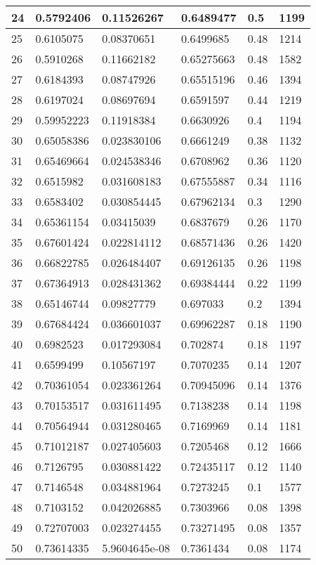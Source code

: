 \begin{longtable}{|l|l|l|l|l|l|}
24 & 0.5792406 & 0.11526267 & 0.6489477 & 0.5 & 1199 \\ \hline 
25 & 0.6105075 & 0.08370651 & 0.6499685 & 0.48 & 1214 \\ \hline 
26 & 0.5910268 & 0.11662182 & 0.65275663 & 0.48 & 1582 \\ \hline 
27 & 0.6184393 & 0.08747926 & 0.65515196 & 0.46 & 1394 \\ \hline 
28 & 0.6197024 & 0.08697694 & 0.6591597 & 0.44 & 1219 \\ \hline 
29 & 0.59952223 & 0.11918384 & 0.6630926 & 0.4 & 1194 \\ \hline 
30 & 0.65058386 & 0.023830106 & 0.6661249 & 0.38 & 1132 \\ \hline 
31 & 0.65469664 & 0.024538346 & 0.6708962 & 0.36 & 1120 \\ \hline 
32 & 0.6515982 & 0.031608183 & 0.67555887 & 0.34 & 1116 \\ \hline 
33 & 0.6583402 & 0.030854445 & 0.67962134 & 0.3 & 1290 \\ \hline 
34 & 0.65361154 & 0.03415039 & 0.6837679 & 0.26 & 1170 \\ \hline 
35 & 0.67601424 & 0.022814112 & 0.68571436 & 0.26 & 1420 \\ \hline 
36 & 0.66822785 & 0.026484407 & 0.69126135 & 0.26 & 1198 \\ \hline 
37 & 0.67364913 & 0.028431362 & 0.69384444 & 0.22 & 1199 \\ \hline 
38 & 0.65146744 & 0.09827779 & 0.697033 & 0.2 & 1394 \\ \hline 
39 & 0.67684424 & 0.036601037 & 0.69962287 & 0.18 & 1190 \\ \hline 
40 & 0.6982523 & 0.017293084 & 0.702874 & 0.18 & 1197 \\ \hline 
41 & 0.6599499 & 0.10567197 & 0.7070235 & 0.14 & 1207 \\ \hline 
42 & 0.70361054 & 0.023361264 & 0.70945096 & 0.14 & 1376 \\ \hline 
43 & 0.70153517 & 0.031611495 & 0.7138238 & 0.14 & 1198 \\ \hline 
44 & 0.70564944 & 0.031280465 & 0.7169969 & 0.14 & 1181 \\ \hline 
45 & 0.71012187 & 0.027405603 & 0.7205468 & 0.12 & 1666 \\ \hline 
46 & 0.7126795 & 0.030881422 & 0.72435117 & 0.12 & 1140 \\ \hline 
47 & 0.7146548 & 0.034881964 & 0.7273245 & 0.1 & 1577 \\ \hline 
48 & 0.7103152 & 0.042026885 & 0.7303966 & 0.08 & 1398 \\ \hline 
49 & 0.72707003 & 0.023274455 & 0.73271495 & 0.08 & 1357 \\ \hline 
50 & 0.73614335 & 5.9604645e-08 & 0.7361434 & 0.08 & 1174 \\ \hline 
\end{longtable}